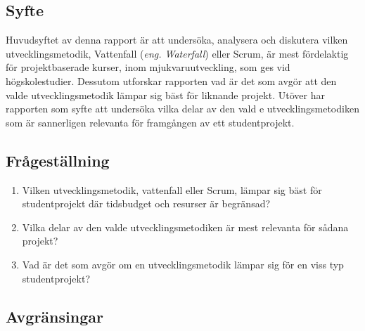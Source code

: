 \subsection{Syfte}
Huvudsyftet av denna rapport är att undersöka, analysera och diskutera vilken utvecklingsmetodik, Vattenfall (\textit{eng. Waterfall}) eller Scrum,
 är mest fördelaktig för projektbaserade kurser, inom mjukvaruutveckling, som ges vid högskolestudier. Dessutom utforskar rapporten vad är det som
  avgör att den valde utvecklingsmetodik lämpar sig bäst för liknande projekt. Utöver har rapporten som syfte att undersöka vilka delar av den vald
  e utvecklingsmetodiken som är sannerligen relevanta för framgången av ett studentprojekt.
 \
\subsection{Frågeställning}
\label{subsec:Lieth_Wahid-research-questions}

\begin{enumerate}
	
	\item Vilken utvecklingsmetodik, vattenfall eller Scrum, lämpar sig bäst för studentprojekt där tidsbudget och resurser är begränsad? 
	
	\item  Vilka delar av den valde utvecklingsmetodiken är mest relevanta för sådana projekt? 
	
	\item Vad är det som avgör om en utvecklingsmetodik lämpar sig för en viss typ studentprojekt? 

\end{enumerate}

\subsection{Avgränsingar}
\label{subsec:Lieth_Wahid-delimitations}

